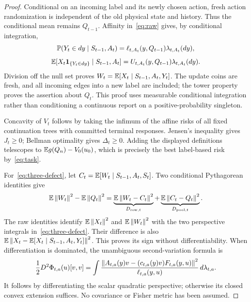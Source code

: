 \begin{proof}
Conditional on an incoming label and its newly chosen action, fresh action randomization is independent of the old physical state and history. Thus the conditional mean remains $Q_{t-1}$. Affinity in~\eqref{eq:raw} gives, by conditional integration,
\[
 \mathbb P(Y_t\in dy\mid S_{t-1},A_t)=\ell_{t,A_t}(y,Q_{t-1})\lambda_{t,A_t}(dy),
\]
\[
 \mathbb E[X_t\mathbf 1_{\{Y_t\in dy\}}\mid S_{t-1},A_t]
     =U_{t,A_t}(y,Q_{t-1})\lambda_{t,A_t}(dy).
\]
Division off the null set proves $W_t=\mathbb E[X_t\mid S_{t-1},A_t,Y_t]$. The update coins are fresh, and all incoming edges into a new label are included; the tower property proves the assertion about $Q_t$. This proof uses measurable conditional integration rather than conditioning a continuous report on a positive-probability singleton.

Concavity of $V_t$ follows by taking the infimum of the affine risks of all fixed continuation trees with committed terminal responses. Jensen's inequality gives $J_t\ge0$; Bellman optimality gives $\Delta_t\ge0$. Adding the displayed definitions telescopes to $\mathbb E g(Q_n)-V_0(u_0)$, which is precisely the best label-based risk by~\eqref{eq:task}.

For~\eqref{eq:three-defect}, let $C_t=\mathbb E[W_t\mid S_{t-1},A_t,S_t]$. Two conditional Pythagorean identities give
\[
 \mathbb E\left\lVert W_t\right\rVert^2-\mathbb E\left\lVert Q_t\right\rVert^2
 =\underbrace{\mathbb E\left\lVert W_t-C_t\right\rVert^2}_{D_{{\rm row},t}}
 +\underbrace{\mathbb E\left\lVert C_t-Q_t\right\rVert^2}_{D_{{\rm pool},t}}.
\]
The raw identities identify $\mathbb E\left\lVert X_t\right\rVert^2$ and $\mathbb E\left\lVert W_t\right\rVert^2$ with the two perspective integrals in~\eqref{eq:three-defect}. Their difference is also
$\mathbb E\left\lVert X_t-\mathbb E[X_t\mid S_{t-1},A_t,Y_t]\right\rVert^2$.
This proves its sign without differentiability. When differentiation is dominated, the unambiguous second-variation formula is
\begin{equation}\label{eq:hessian}
 \frac12D^2\Phi_{t,a}(u)[v,v]
 =\int\frac{\left\lVert A_{t,a}(y)v-(c_{t,a}(y)v)F_{t,a}(y,u)\right\rVert^2}
                 {\ell_{t,a}(y,u)}\,d\lambda_{t,a}.
\end{equation}
It follows by differentiating the scalar quadratic perspective; otherwise its closed convex extension suffices. No covariance or Fisher metric has been assumed.
\end{proof}

